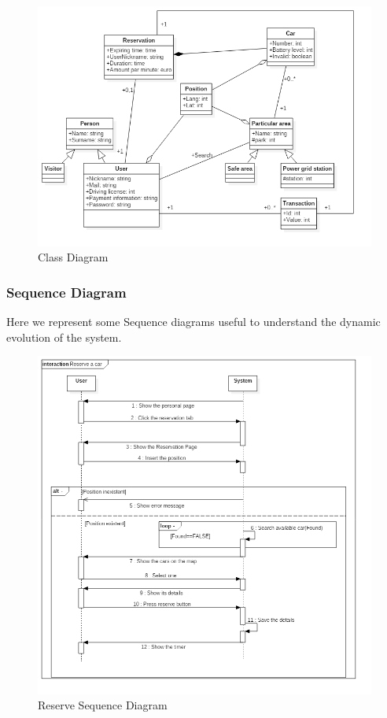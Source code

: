 \begin{figure}[htbp]
\centering
\includegraphics[width=\textwidth]{Images/UML/ClassDiagram}
\caption{Class Diagram}
\label{fig:class}
\end{figure}
\clearpage

\subsubsection{Sequence Diagram}
Here we represent some Sequence diagrams useful to understand the dynamic evolution of the system.
\vspace{10pt}
\begin{figure}[htbp]
\centering
\includegraphics[width=\textwidth]{Images/UML/Reserve}
\caption{Reserve Sequence Diagram}
\label{fig:resseq}
\end{figure}
\clearpage

